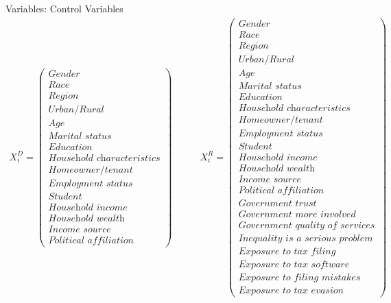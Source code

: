 \documentclass{beamer}
\begin{document}
\begin{frame}{Variables: Control Variables}
\label{Controlvariables}
{\tiny
\[
\begin{array}{ccc}
X_i^{D} =
\left(
\begin{array}{c}
\textit{Gender} \\[0.2em]
\textit{Race} \\[0.2em]
\textit{Region} \\[0.2em]
\textit{Urban/Rural} \\[0.2em]
\textit{Age} \\[0.2em]
\textit{Marital status} \\[0.2em]
\textit{Education} \\[0.2em]
\textit{Household characteristics} \\[0.2em]
\textit{Homeowner/tenant} \\[0.2em]
\textit{Employment status}\\[0.2em]
\textit{Student} \\[0.2em]
\textit{Household income} \\[0.2em]
\textit{Household wealth} \\[0.2em]
\textit{Income source} \\[0.2em]
\textit{Political affiliation}
\end{array}
\right)

& \qquad\qquad &
X_i^{R} =
\left(
\begin{array}{c}
\textit{Gender} \\[0.2em]
\textit{Race} \\[0.2em]
\textit{Region} \\[0.2em]
\textit{Urban/Rural} \\[0.2em]
\textit{Age} \\[0.2em]
\textit{Marital status} \\[0.2em]
\textit{Education} \\[0.2em]
\textit{Household characteristics} \\[0.2em]
\textit{Homeowner/tenant} \\[0.2em]
\textit{Employment status}\\[0.2em]
\textit{Student} \\[0.2em]
\textit{Household income} \\[0.2em]
\textit{Household wealth} \\[0.2em]
\textit{Income source} \\[0.2em]
\textit{Political affiliation} \\[0.2em]
\textit{Government trust} \\[0.2em]
\textit{Government more involved} \\[0.2em]
\textit{Government quality of services} \\[0.2em]
\textit{Inequality is a serious problem}\\[0.2em]
\textit{Exposure to tax filing}\\[0.2em]
\textit{Exposure to tax software}\\[0.2em]
\textit{Exposure to filing mistakes}\\[0.2em]
\textit{Exposure to tax evasion}
\end{array}
\right)


\end{array}\]}
\end{frame}
\end{document}
